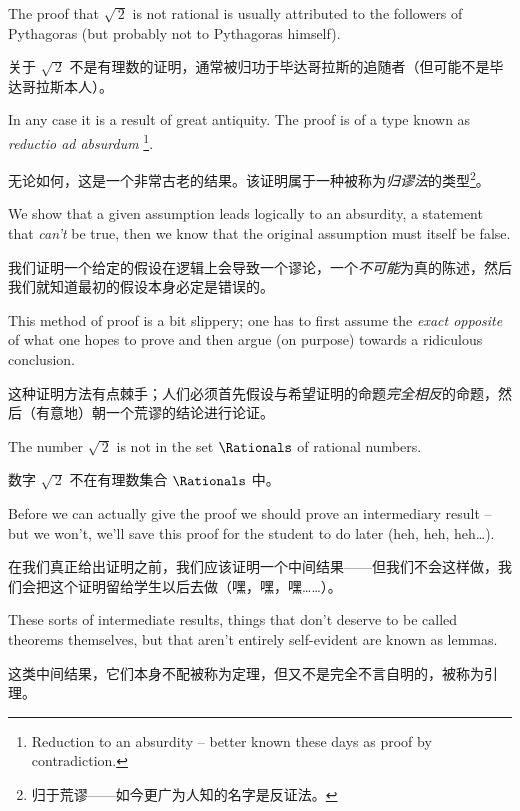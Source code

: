 The proof that $\sqrt{\,2}$ is
not rational is usually attributed to the followers of Pythagoras (but
probably not to Pythagoras himself).

关于 $\sqrt{\,2}$ 不是有理数的证明，通常被归功于毕达哥拉斯的追随者（但可能不是毕达哥拉斯本人）。

In any case it is a result of
great antiquity.  The proof is of a type known as 
 \emph{reductio ad absurdum}
\footnote{Reduction to an absurdity -- better known these %
days as proof by contradiction.}.

无论如何，这是一个非常古老的结果。该证明属于一种被称为\emph{归谬法}的类型\footnote{归于荒谬——如今更广为人知的名字是反证法。}。

We show that a given assumption
leads logically to an absurdity, a statement that {\em can't} be true,
then we know that the original assumption must itself be false.

我们证明一个给定的假设在逻辑上会导致一个谬论，一个{\em 不可能}为真的陈述，然后我们就知道最初的假设本身必定是错误的。

This 
method of proof is a bit slippery; one has to first assume the 
\emph{exact opposite} of what one hopes to prove and then argue (on
purpose) towards a ridiculous conclusion.

这种证明方法有点棘手；人们必须首先假设与希望证明的命题\emph{完全相反}的命题，然后（有意地）朝一个荒谬的结论进行论证。

\begin{thm} The number $\sqrt{\,2}$ is not in the set $\Rationals$ of
rational numbers.
\end{thm}

\begin{thm}
数字 $\sqrt{\,2}$ 不在有理数集合 $\Rationals$ 中。
\end{thm}

Before we can actually give the proof we should prove an intermediary 
result -- but we won't, we'll save this proof for the student to do 
later (heh, heh, heh\ldots).

在我们真正给出证明之前，我们应该证明一个中间结果——但我们不会这样做，我们会把这个证明留给学生以后去做（嘿，嘿，嘿……）。

These sorts of intermediate results, things that don't deserve to be
called theorems themselves, but that aren't entirely self-evident are
known as  lemmas.

这类中间结果，它们本身不配被称为定理，但又不是完全不言自明的，被称为引理。

